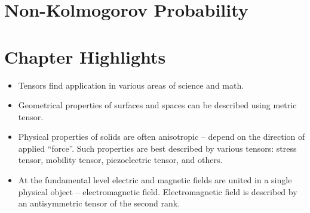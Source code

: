\section{Non-Kolmogorov Probability}

\section*{Chapter Highlights}
{\chhc
	\it	
	\begin{itemize}
		\item Tensors find application in various areas of science and math.
		\item Geometrical properties of surfaces and spaces can be described
		using metric tensor.
		\item Physical properties of solids are often anisotropic -- depend on
		the direction of applied ``force''. Such properties are best
		described by various tensors: stress tensor, mobility tensor,
		piezoelectric tensor, and others.
		\item At the fundamental level electric and magnetic fields are united
		in a single physical object -- electromagnetic field. Electromagnetic
		field is described by an antisymmetric tensor of the second rank.
	\end{itemize}
	
}